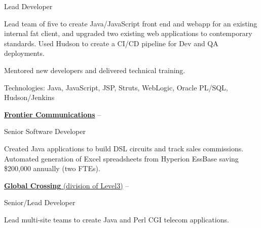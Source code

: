 \documentclass[letterpaper,MMMMyyyy,nonstopmode]{simpleresumecv}
\newcommand{\comment}[1]{\ignorespaces} %
\newif\ifLOCATION
\begin{document}
\begin{Body}
Lead Developer
\ifLOCATION
\hfill
Rochester, New York
\fi

\begin{Detail}
\BulletItem
Lead team of five to create Java/JavaScript front end and webapp for an existing internal fat client, and upgraded two existing web applications to contemporary standards. Used Hudson to create a CI/CD pipeline for Dev and QA deployments.

\BulletItem
Mentored new developers and delivered technical training.
\iffalse
\BulletItem
Member of architecture team to research and set five-year strategy for web application strategy.
\fi

\Gap
Technologies: Java, JavaScript, JSP, Struts, WebLogic, Oracle PL/SQL, Hudson/Jenkins 
\end{Detail}

\BigGap
\Entry
\href{http://www.frontier.com/}
{\textbf{Frontier Communications}}
\hfill 
 -- 

Senior Software Developer
\ifLOCATION
\hfill
Rochester, New York
\fi

\begin{Detail}
\Item
Created Java applications to build DSL circuits and track sales commissions\comment{; CruiseControl used for Continuous Integration}. 
Automated generation of \comment{20} Excel spreadsheets from Hyperion EssBase saving \$200,000 annually (two FTEs).

\end{Detail}

\BigGap
\Entry
\href{http://www.globalcrossing.com/}
{\textbf{Global  Crossing} (division of Level3)}
\hfill 
 -- 

Senior/Lead Developer
\ifLOCATION
\hfill
Rochester, New York
\fi

\begin{Detail}
\Item
Lead multi-site teams to create Java and Perl CGI telecom applications.

\end{Detail}


\end{Body}
\end{document}
